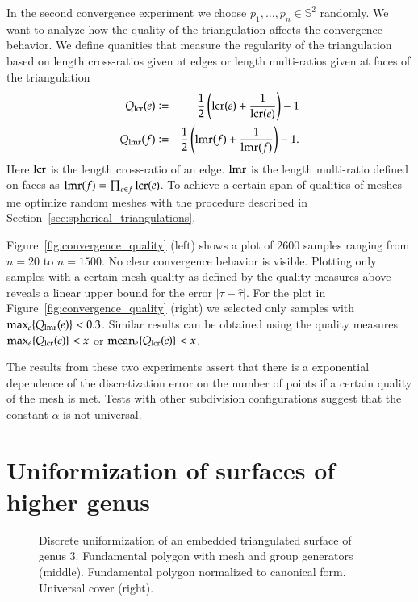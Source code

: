 \documentclass[Thesis]{subfiles}
\begin{document}
In the second convergence experiment we choose $p_1,\ldots,p_n\in \mathbb S^2$ randomly. 
We want to analyze how the quality of the triangulation affects the convergence behavior. 
We define quanities that measure the regularity of the triangulation based on length cross-ratios given at edges or length multi-ratios given at faces of the triangulation
\begin{eqnarray*}
	Q_{\operatorname{lcr}}(e) &\vcentcolon=& \frac{1}{2}\left(\operatorname{lcr}(e) + \frac{1}{\operatorname{lcr}(e)}\right) - 1\label{eq:quality_lcr}\\
	Q_{\operatorname{lmr}}(f) &\vcentcolon=& \frac{1}{2}\left(\operatorname{lmr}(f) + \frac{1}{\operatorname{lmr}(f)}\right) - 1\label{eq:quality_lmr}.
\end{eqnarray*}
Here $\operatorname{lcr}$ is the length cross-ratio of an edge. 
$\operatorname{lmr}$ is the length multi-ratio defined on faces as $\operatorname{lmr}(f)=\prod_{e \in f}\operatorname{lcr}(e)$.
To achieve a certain span of qualities of meshes me optimize random meshes with the procedure described in Section~\ref{sec:spherical_triangulations}.

Figure~\ref{fig:convergence_quality} (left) shows a plot of $2600$ samples ranging from $n=20$ to $n=1500$. 
No clear convergence behavior is visible. 
Plotting only samples with a certain mesh quality as defined by the quality measures above reveals a linear upper bound for the error $|\tau-\hat \tau|$. 
For the plot in Figure~\ref{fig:convergence_quality} (right) we selected only samples with $\max_e \{Q_{\operatorname{lmr}}(e)\} < 0.3$. 
Similar results can be obtained using the quality measures $\max_e \{Q_{\operatorname{lcr}}(e)\} < x$ or $\operatorname{mean}_e \{Q_{\operatorname{lcr}}(e)\} < x$.

The results from these two experiments assert that there is a exponential dependence of the discretization error on the number of points if a certain quality of the mesh is met. 
Tests with other subdivision configurations suggest that the constant $\alpha$ is not universal.

\section{Uniformization of surfaces of higher genus}
\label{sec:higher_genus}

\begin{figure}
\centering
{}
\caption{Discrete uniformization of an embedded triangulated surface of genus $3$. Fundamental polygon with mesh and group generators (middle). Fundamental polygon normalized to canonical form. Universal cover (right).}
\label{fig:embedded_genus_3}
\end{figure}
\end{document}

